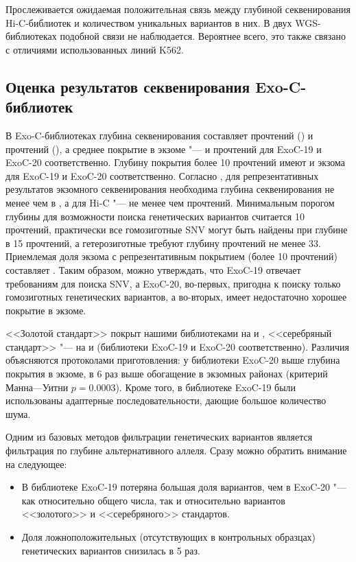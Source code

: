 \documentclass[12pt, twoside, a4paper]{article}
\newcommand{\mln}{млн}
\begin{document}
Прослеживается ожидаемая положительная связь между глубиной секвенирования Hi-C\hyp{}библиотек и количеством уникальных вариантов в них.
В двух WGS\hyp{}библиотеках подобной связи не наблюдается.
Вероятнее всего, это также связано с отличиями использованных линий K562.

\subsection{Оценка результатов секвенирования Exo-C\hyp{}библиотек}

В Exo-C\hyp{}библиотеках глубина секвенирования составляет \numprint[\mln]{136.6} прочтений () и \numprint[\mln]{109.4} прочтений (), а среднее покрытие в экзоме "---  и  прочтений для ExoC-19 и ExoC-20 соответственно.
Глубину покрытия более 10 прочтений имеют  и  экзома для ExoC-19 и ExoC-20 соответственно.
Согласно \cite{Sims_2014}, для репрезентативных результатов экзомного секвенирования необходима глубина секвенирования не менее чем в , а для Hi-C "--- не менее чем \numprint[\mln]{100} прочтений.
Минимальным порогом глубины для возможности поиска генетических вариантов считается 10 прочтений, практически все гомозиготные SNV могут быть найдены при глубине в 15 прочтений, а гетерозиготные требуют глубину прочтений не менее 33.
Приемлемая доля экзома с репрезентативным покрытием (более 10 прочтений) составляет .
Таким образом, можно утверждать, что ExoC-19 отвечает требованиям для поиска SNV, а ExoC-20, во-первых, пригодна к поиску только гомозиготных генетических вариантов, а во-вторых, имеет недостаточно хорошее покрытие в экзоме.

<<Золотой стандарт>> покрыт нашими библиотеками на  и , <<серебряный стандарт>> "--- на  и  (библиотеки ExoC-19 и ExoC-20 соответственно).
Различия объясняются протоколами приготовления: у библиотеки ExoC-20 выше глубина покрытия в экзоме, в 6 раз выше обогащение в экзомных районах (критерий Манна---Уитни $p = 0.0003$).
Кроме того, в библиотеке ExoC-19 были использованы адаптерные последовательности, дающие большое количество шума.

Одним из базовых методов фильтрации генетических вариантов является фильтрация по глубине альтернативного аллеля.
Сразу можно обратить внимание на следующее:

\begin{itemize}
	\item В библиотеке ExoC-19 потеряна большая доля вариантов, чем в ExoC-20 "--- как относительно общего числа, так и относительно вариантов <<золотого>> и <<серебряного>> стандартов.
	\item Доля ложноположительных (отсутствующих в контрольных образцах) генетических вариантов снизилась в 5 раз.
\end{itemize}
\end{document}
